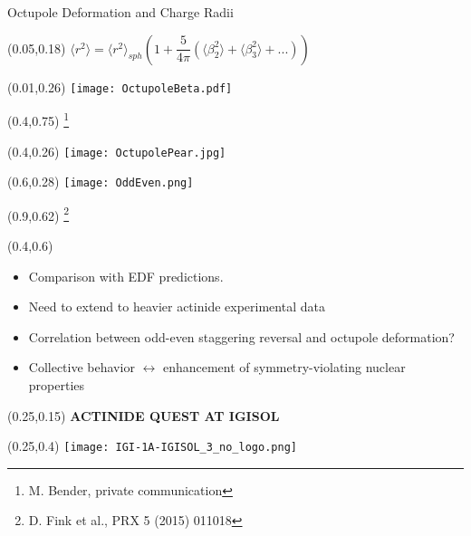 \documentclass[10pt,aspectratio=169]{beamer}
\begin{document}
\begin{frame}{Octupole Deformation and Charge Radii}
	\begin{textblock*}{0.9\paperwidth}(0.05\paperwidth,0.18\paperheight)
		\centering
		$\langle r^2 \rangle = \langle r^2 \rangle_{sph} \left( 1+\dfrac{5}{4 \pi}\left( \langle \beta^2_2\rangle+\langle \beta^2_3\rangle+...\right)\right)$
	\end{textblock*}
	\begin{textblock*}{0.4\paperwidth}(0.01\paperwidth,0.26\paperheight)
		\texttt{[image: OctupoleBeta.pdf]}
	\end{textblock*}
	\begin{textblock*}{0.1\paperwidth}(0.4\paperwidth,0.75\paperheight)
		\footnote{M. Bender, private communication}
	\end{textblock*}
	\begin{textblock*}{0.15\paperwidth}(0.4\paperwidth,0.26\paperheight)
		\texttt{[image: OctupolePear.jpg]}
	\end{textblock*}
	\begin{textblock*}{0.4\paperwidth}(0.6\paperwidth,0.28\paperheight)
		\texttt{[image: OddEven.png]}
	\end{textblock*}
	\begin{textblock*}{0.1\paperwidth}(0.9\paperwidth,0.62\paperheight)
		\footnote{D. Fink et al., PRX 5 (2015) 011018}
	\end{textblock*}
	\begin{textblock*}{0.6\paperwidth}(0.4\paperwidth,0.6\paperheight)
		\small	
		\begin{itemize}
				\item Comparison with EDF predictions. 
				\item Need to extend to heavier actinide experimental data
				\item Correlation between odd-even staggering reversal and octupole deformation?
				\item Collective behavior $\leftrightarrow$ enhancement of symmetry-violating nuclear properties
			\end{itemize}
	\end{textblock*}
\end{frame}


\begin{SectionTitle}
	\begin{frame}
		\centering
		\begin{textblock*}{0.5\paperwidth}(0.25\paperwidth,0.15\paperheight)
			\centering
			\textbf{\LARGE ACTINIDE QUEST AT IGISOL}	
		\end{textblock*}
		\begin{textblock*}{0.5\paperwidth}(0.25\paperwidth,0.4\paperheight)
			\texttt{[image: IGI-1A-IGISOL\_3\_no\_logo.png]}
		\end{textblock*}
	\end{frame}
\end{SectionTitle}
\end{document}
